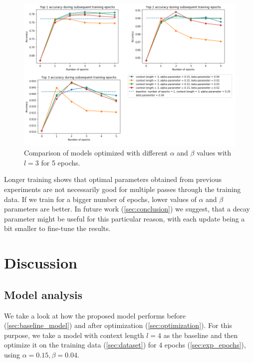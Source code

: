 \documentclass{llncs}
\begin{document}
\begin{figure}
    \centering
    \caption{Comparison of models optimized with different \(\alpha\) and \(\beta\) values with \(l=3\) for 5 epochs.}
    \label{fig:exp4_2_epochs_comparison}
    \includegraphics[scale=0.65]{res/exp4_epoch_multiconfiguration_top_acc.png}
\end{figure}

Longer training shows that optimal parameters obtained from previous experiments are not necessarily good for multiple passes through the training data.
If we train for a bigger number of epochs, lower values of \(\alpha\) and \(\beta\) parameters are better.
In future work (\ref{sec:conclusion}) we suggest, that a decay parameter might be useful for this particular reason, with each update being a bit smaller to fine-tune the results.


\section{Discussion}
\label{sec:discussion}

\subsection{Model analysis}
\label{sec:model_analysis}
We take a look at how the proposed model performs before (\ref{sec:baseline_model}) and after optimization (\ref{sec:optimization}).
For this purpose, we take a model with context length \(l=4\) as the baseline and then optimize it on the training data (\ref{sec:dataset}) for 4 epochs (\ref{sec:exp_epochs}), using \(\alpha=0.15, \beta=0.04\).
\end{document}
